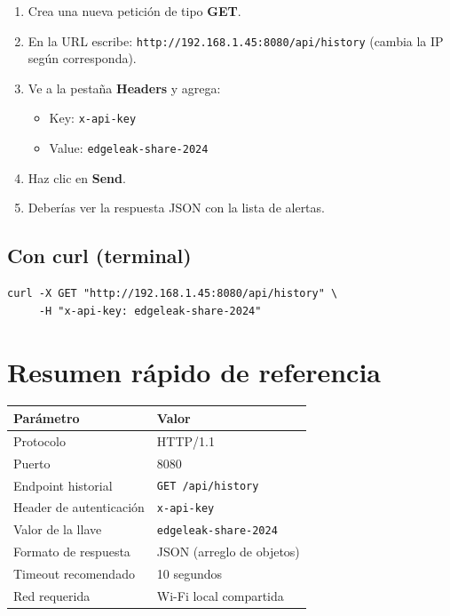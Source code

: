 \documentclass[12pt, a4paper]{article}
\begin{document}
\begin{enumerate}[leftmargin=*, label=\arabic*.)]
  \item Crea una nueva petición de tipo \textbf{GET}.
  \item En la URL escribe: \texttt{http://192.168.1.45:8080/api/history}
        (cambia la IP según corresponda).
  \item Ve a la pestaña \textbf{Headers} y agrega:
        \begin{itemize}
          \item Key: \texttt{x-api-key}
          \item Value: \texttt{edgeleak-share-2024}
        \end{itemize}
  \item Haz clic en \textbf{Send}.
  \item Deberías ver la respuesta JSON con la lista de alertas.
\end{enumerate}

\subsection{Con curl (terminal)}

\begin{lstlisting}[style=httpStyle, caption={Comando curl de prueba}]
curl -X GET "http://192.168.1.45:8080/api/history" \
     -H "x-api-key: edgeleak-share-2024"
\end{lstlisting}

\section{Resumen rápido de referencia}

\begin{center}
\begin{tabular}{l l}
  \toprule
  \textbf{Parámetro}       & \textbf{Valor} \\
  \midrule
  Protocolo              & HTTP/1.1 \\
  Puerto                 & 8080 \\
  Endpoint historial     & \texttt{GET /api/history} \\
  Header de autenticación& \texttt{x-api-key} \\
  Valor de la llave      & \texttt{edgeleak-share-2024} \\
  Formato de respuesta   & JSON (arreglo de objetos) \\
  Timeout recomendado    & 10 segundos \\
  Red requerida          & Wi-Fi local compartida \\
  \bottomrule
\end{tabular}
\end{center}
\end{document}
